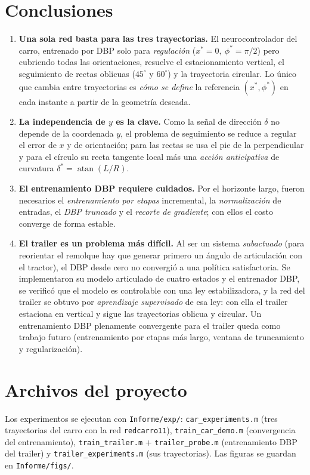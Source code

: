 \documentclass[11pt,a4paper]{article}
\newcommand{\code}[1]{\texttt{\small #1}}
\begin{document}
\section{Conclusiones}
\begin{enumerate}
  \item \textbf{Una sola red basta para las tres trayectorias.} El neurocontrolador del
  carro, entrenado por DBP solo para \emph{regulación} ($x^*=0,\ \phi^*=\pi/2$) pero
  cubriendo todas las orientaciones, resuelve el estacionamiento vertical, el seguimiento
  de rectas oblicuas ($45^\circ$ y $60^\circ$) y la trayectoria circular. Lo único que
  cambia entre trayectorias es \emph{cómo se define} la referencia $(x^*,\phi^*)$ en cada
  instante a partir de la geometría deseada.

  \item \textbf{La independencia de $y$ es la clave.} Como la señal de dirección $\delta$
  no depende de la coordenada $y$, el problema de seguimiento se reduce a regular el error
  de $x$ y de orientación; para las rectas se usa el pie de la perpendicular y para el
  círculo su recta tangente local más una \emph{acción anticipativa} de curvatura
  $\delta^*=\operatorname{atan}(L/R)$.

  \item \textbf{El entrenamiento DBP requiere cuidados.} Por el horizonte largo, fueron
  necesarios el \emph{entrenamiento por etapas} incremental, la \emph{normalización} de entradas, el
  \emph{DBP truncado} y el \emph{recorte de gradiente}; con ellos el costo converge de
  forma estable.

  \item \textbf{El trailer es un problema más difícil.} Al ser un sistema
  \emph{subactuado} (para reorientar el remolque hay que generar primero un ángulo de
  articulación con el tractor), el DBP desde cero no convergió a una política
  satisfactoria. Se implementaron su modelo articulado de cuatro estados y el entrenador
  DBP, se verificó que el modelo es controlable con una ley estabilizadora, y la red del
  trailer se obtuvo por \emph{aprendizaje supervisado} de esa ley: con ella el trailer
  estaciona en vertical y sigue las trayectorias oblicua y circular. Un entrenamiento
  DBP plenamente convergente para el trailer queda como trabajo futuro (entrenamiento por etapas más
  largo, ventana de truncamiento y regularización).
\end{enumerate}

\appendix
\section{Archivos del proyecto}
Los experimentos se ejecutan con \code{Informe/exp/}: \code{car\_experiments.m} (tres
trayectorias del carro con la red \code{redcarro11}), \code{train\_car\_demo.m}
(convergencia del entrenamiento), \code{train\_trailer.m} + \code{trailer\_probe.m}
(entrenamiento DBP del trailer) y \code{trailer\_experiments.m} (sus trayectorias). Las
figuras se guardan en \code{Informe/figs/}.
\end{document}
